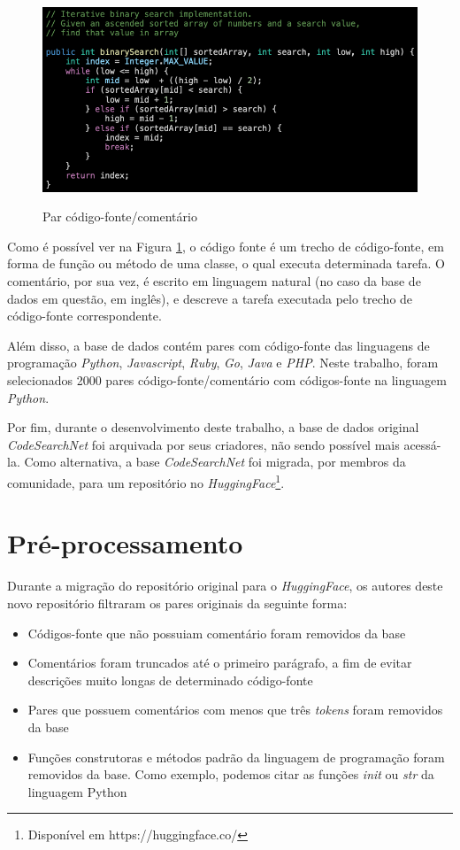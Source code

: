 \begin{figure}[H]
    \centering
        \caption{Par código-fonte/comentário}
        \includegraphics[scale=0.5]{code-comment-pair.png}
        \label{fig:metodology-code-comment-pair}
\end{figure}

Como é possível ver na Figura \ref{fig:metodology-code-comment-pair}, o código fonte é um trecho de código-fonte, em forma de função ou método de uma classe, o qual executa determinada tarefa. O comentário, por sua vez, é escrito em linguagem natural (no caso da base de dados em questão, em inglês), e descreve a tarefa executada pelo trecho de código-fonte correspondente.

Além disso, a base de dados contém pares com código-fonte das linguagens de programação \textit{Python}, \textit{Javascript}, \textit{Ruby}, \textit{Go}, \textit{Java} e \textit{PHP}. Neste trabalho, foram selecionados 2000 pares código-fonte/comentário com códigos-fonte na linguagem \textit{Python}.

Por fim, durante o desenvolvimento deste trabalho, a base de dados original \textit{CodeSearchNet} foi arquivada por seus criadores, não sendo possível mais acessá-la. Como alternativa, a base \textit{CodeSearchNet} foi migrada, por membros da comunidade, para um repositório no \textit{HuggingFace}\footnote{Disponível em https://huggingface.co/}.

\section{Pré-processamento}
\label{sec:methodology:pre-processing}

Durante a migração do repositório original para o \textit{HuggingFace}, os autores deste novo repositório filtraram os pares originais da seguinte forma:
\begin{itemize}
    \item Códigos-fonte que não possuiam comentário foram removidos da base
    \item Comentários foram truncados até o primeiro parágrafo, a fim de evitar descrições muito longas de determinado código-fonte
    \item Pares que possuem comentários com menos que três \textit{tokens} foram removidos da base
    \item Funções construtoras e métodos padrão da linguagem de programação foram removidos da base. Como exemplo, podemos citar as funções \textit{init} ou \textit{str} da linguagem Python
\end{itemize}

